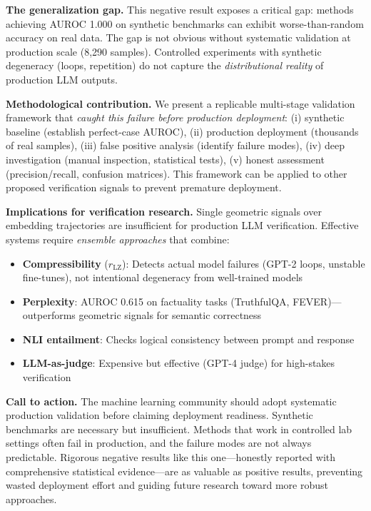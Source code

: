 \documentclass[11pt]{article}
\begin{document}
\textbf{The generalization gap.} This negative result exposes a critical gap: methods achieving AUROC 1.000 on synthetic benchmarks can exhibit worse-than-random accuracy on real data. The gap is not obvious without systematic validation at production scale (8,290 samples). Controlled experiments with synthetic degeneracy (loops, repetition) do not capture the \textit{distributional reality} of production LLM outputs.

\textbf{Methodological contribution.} We present a replicable multi-stage validation framework that \textit{caught this failure before production deployment}: (i) synthetic baseline (establish perfect-case AUROC), (ii) production deployment (thousands of real samples), (iii) false positive analysis (identify failure modes), (iv) deep investigation (manual inspection, statistical tests), (v) honest assessment (precision/recall, confusion matrices). This framework can be applied to other proposed verification signals to prevent premature deployment.

\textbf{Implications for verification research.} Single geometric signals over embedding trajectories are insufficient for production LLM verification. Effective systems require \textit{ensemble approaches} that combine:
\begin{itemize}
\item \textbf{Compressibility} ($r_{\text{LZ}}$): Detects actual model failures (GPT-2 loops, unstable fine-tunes), not intentional degeneracy from well-trained models
\item \textbf{Perplexity}: AUROC 0.615 on factuality tasks (TruthfulQA, FEVER)---outperforms geometric signals for semantic correctness
\item \textbf{NLI entailment}: Checks logical consistency between prompt and response
\item \textbf{LLM-as-judge}: Expensive but effective (GPT-4 judge) for high-stakes verification
\end{itemize}

\textbf{Call to action.} The machine learning community should adopt systematic production validation before claiming deployment readiness. Synthetic benchmarks are necessary but insufficient. Methods that work in controlled lab settings often fail in production, and the failure modes are not always predictable. Rigorous negative results like this one---honestly reported with comprehensive statistical evidence---are as valuable as positive results, preventing wasted deployment effort and guiding future research toward more robust approaches.
\end{document}
